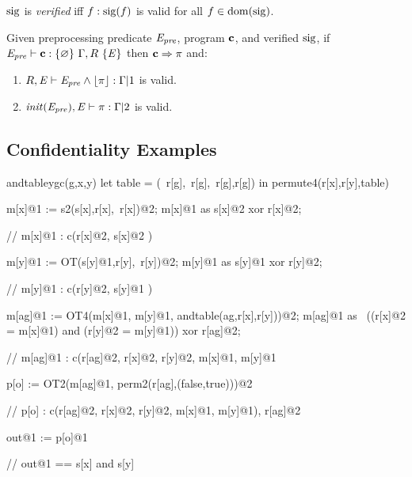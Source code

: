 \begin{definition}
  $\mathrm{sig}$ is \emph{verified} iff $f : \mathrm{sig}(f)$ is valid for all $f \in \mathrm{dom}(\mathrm{sig})$.
\end{definition}

\begin{theorem}
  Given preprocessing predicate $\mathit{E}_{\mathit{pre}}$, program $\mathbf{c}$, and verified $\mathrm{sig}$, if
  $\mathit{E}_{\mathit{pre}} \vdash \mathbf{c} : \{ \varnothing \}\ \Gamma,R\ \{ \mathit{E} \}$ then
  $\mathbf{c} \Rightarrow \pi$ and:
  \begin{enumerate}
  \item $R,\mathit{E} \vdash \mathit{E}_{\mathit{pre}} \wedge \lfloor \pi \rfloor : \Gamma|1$ is valid.
  \item $\mathit{init}(\mathit{E}_{\mathit{pre}}),\mathit{E} \vdash \pi : \Gamma|2$ is valid.
  \end{enumerate}
\end{theorem}

\subsection{Confidentiality Examples}

\begin{verbatimtab}
andtableygc(g,x,y)
{
   let table = (~r[g],~r[g],~r[g],r[g])
   in permute4(r[x],r[y],table)
}

m[x]@1 := s2(s[x],r[x],~r[x])@2;
m[x]@1 as s[x]@2 xor r[x]@2;

// m[x]@1 : { c(r[x]@2, { s[x]@2 }) } 

m[y]@1 := OT(s[y]@1,r[y],~r[y])@2;
m[y]@1 as s[y]@1 xor r[y]@2;

// m[y]@1 : { c(r[y]@2, { s[y]@1 }) } 
	      
m[ag]@1 := OT4(m[x]@1, m[y]@1, andtable(ag,r[x],r[y]))@2;
m[ag]@1 as  ~((r[x]@2 = m[x]@1) and (r[y]@2 = m[y]@1)) xor r[ag]@2;

// m[ag]@1 : { c(r[ag]@2, {r[x]@2, r[y]@2, m[x]@1,  m[y]@1} }

p[o] := OT2(m[ag]@1, perm2(r[ag],(false,true)))@2

// p[o] : { c(r[ag]@2, {r[x]@2, r[y]@2,  m[x]@1,  m[y]@1}), r[ag]@2  } 

out@1 := p[o]@1

// out@1 == s[x] and s[y]
\end{verbatimtab}

